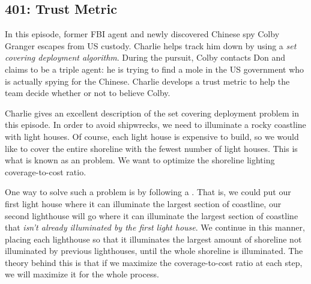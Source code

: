 \newpage
\subsection{401: Trust Metric}\label{401}

In this episode, former FBI agent and newly discovered Chinese spy Colby Granger escapes from US custody. Charlie helps track him down by using a \emph{set covering deployment algorithm}. During the pursuit, Colby contacts Don and claims to be a triple agent: he is trying to find a mole in the US government who is actually spying for the Chinese. Charlie develops a trust metric to help the team decide whether or not to believe Colby. \\


Charlie gives an excellent description of the set covering deployment problem in this episode. In order to avoid shipwrecks, we need to illuminate a rocky coastline with light houses. Of course, each light house is expensive to build, so we would like to cover the entire shoreline with the fewest number of light houses. This is what is known as an  problem. We want to optimize the shoreline lighting coverage-to-cost ratio. \\

 \vspace{0.2cm}

One way to solve such a problem is by following a . That is, we could put our first light house where it can illuminate the largest section of coastline, our second lighthouse will go where it can illuminate the largest section of coastline that \emph{isn't already illuminated by the first light house}. We continue in this manner, placing each lighthouse so that it illuminates the largest amount of shoreline not illuminated by previous lighthouses, until the whole shoreline is illuminated. The theory behind this is that if we maximize the coverage-to-cost ratio at each step, we will maximize it for the whole process. \\

